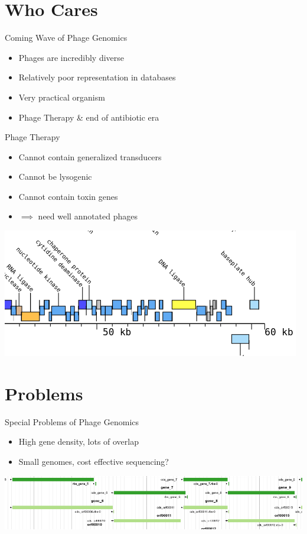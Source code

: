 \documentclass[12pt]{beamer}
\begin{document}
\section{Who Cares}
\begin{frame}{Coming Wave of Phage Genomics}
    \begin{itemize}
        \item Phages are incredibly diverse
        \item Relatively poor representation in databases
        \item Very practical organism
        \item Phage Therapy \& end of antibiotic era
    \end{itemize}
\end{frame}
\begin{frame}{Phage Therapy}
    \begin{itemize}
        \item Cannot contain generalized transducers
        \item Cannot be lysogenic
        \item Cannot contain toxin genes
        \item $\implies$ need well annotated phages
    \end{itemize}
    \centering
    \includegraphics[height=.5\textheight]{./therapy.png}
\end{frame}

\section{Problems}
\begin{frame}{Special Problems of Phage Genomics}
    \begin{itemize}
        \item High gene density, lots of overlap
        \item Small genomes, cost effective sequencing?
    \end{itemize}
    \centering
    \includegraphics[width=\textwidth]{./overlap.png}
\end{frame}
\end{document}
